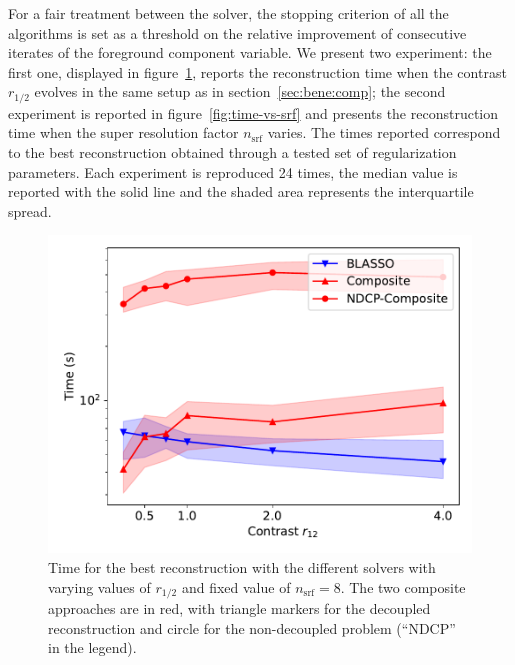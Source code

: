         For a fair treatment between the solver, the stopping criterion of all the algorithms is set as a threshold on the relative improvement of consecutive iterates of the foreground component variable. We present two experiment: the first one, displayed in figure~\ref{fig:time-vs-r}, reports the reconstruction time when the contrast $r_{1/2}$ evolves in the same setup as in section~\ref{sec:bene:comp}; the second experiment is reported in figure~\ref{fig:time-vs-srf} and presents the reconstruction time when the super resolution factor $n_\mathrm{srf}$ varies. The times reported correspond to the best reconstruction obtained through a tested set of regularization parameters. Each experiment is reproduced 24 times, the median value is reported with the solid line and the shaded area represents the interquartile spread.

        \begin{figure}[t]
            \centering
            \includegraphics[width=.7\linewidth]{figures/benchmark/time_vs_r12.pdf}        
            \caption{Time for the best reconstruction with the different solvers with varying values of $r_{1/2}$ and fixed value of $n_\mathrm{srf} = 8$. The two composite approaches are in red, with triangle markers for the decoupled reconstruction and circle for the non-decoupled problem (``NDCP'' in the legend).}
            \label{fig:time-vs-r}
        \end{figure}
    
